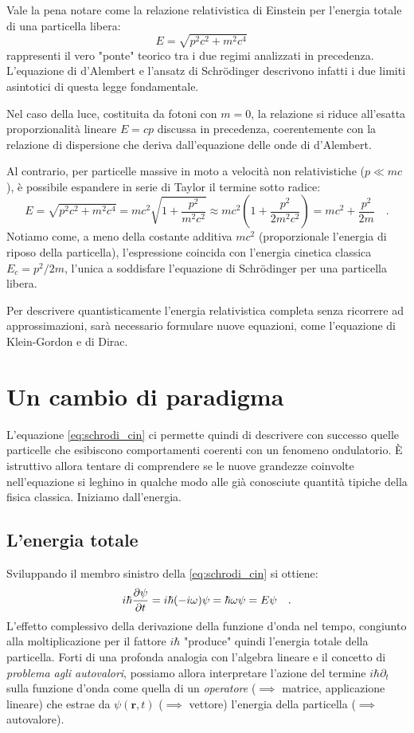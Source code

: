 \begin{approfondimento}[title={Un ponte fra i due mondi: la relatività ristretta}]
Vale la pena notare come la relazione relativistica di Einstein per l'energia totale di una particella libera:
\[
    E = \sqrt{p^2c^2 + m^2c^4} \quad
\]
rappresenti il vero "ponte" teorico tra i due regimi analizzati in precedenza. L'equazione di d'Alembert e l'ansatz di Schrödinger descrivono infatti i due limiti asintotici di questa legge fondamentale. 

Nel caso della luce, costituita da fotoni con $m = 0$, la relazione si riduce all'esatta proporzionalità lineare $E = cp$ discussa in precedenza, coerentemente con la relazione di dispersione che deriva dall'equazione delle onde di d'Alembert. 

Al contrario, per particelle massive in moto a velocità non relativistiche ($p \ll mc$), è possibile espandere in serie di Taylor il termine sotto radice:
\[
    E = \sqrt{p^2c^2 + m^2c^4} = mc^2\sqrt{1 + \frac{p^2}{m^2c^2}} \approx mc^2\left( 1 + \frac{p^2}{2m^2c^2} \right) = mc^2 + \frac{p^2}{2m} \quad.
\]
Notiamo come, a meno della costante additiva $mc^2$ (proporzionale l'energia di riposo della particella), l'espressione coincida con l'energia cinetica classica $E_c = p^2/2m$, l'unica a soddisfare l'equazione di Schrödinger per una particella libera. 

Per descrivere quantisticamente l'energia relativistica completa senza ricorrere ad approssimazioni, sarà necessario formulare nuove equazioni, come l'equazione di Klein-Gordon e di Dirac.
\end{approfondimento}

\section{Un cambio di paradigma}
L'equazione \eqref{eq:schrodi_cin} ci permette quindi di descrivere con successo quelle particelle che esibiscono comportamenti coerenti con
un fenomeno ondulatorio. È istruttivo allora tentare di comprendere se le nuove grandezze coinvolte nell'equazione si leghino in qualche modo alle già conosciute quantità tipiche della fisica classica. Iniziamo dall'energia.

\subsection{L'energia totale}
Sviluppando il membro sinistro della \eqref{eq:schrodi_cin} si ottiene:
\begin{equation}
        i\hbar \pdv{\psi}{t} = i\hbar (-i\omega)\psi = \hbar \omega \psi = E\psi \quad.
        \label{eq:op_E}
\end{equation}
L'effetto complessivo della derivazione della funzione d'onda nel tempo, congiunto alla moltiplicazione per il fattore $i\hbar$ "produce" quindi l'energia totale della particella. Forti di una profonda analogia con l'algebra lineare e il concetto di \emph{problema agli autovalori}, possiamo allora interpretare l'azione del termine $i\hbar \partial_t$ sulla funzione d'onda come quella di un \emph{operatore} ($\implies$ matrice, applicazione lineare) che estrae da $\psi(\bm{r},t)$ ($\implies$ vettore) l'energia della particella ($\implies$ autovalore).

